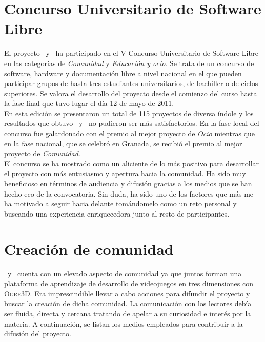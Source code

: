 \section*{Concurso Universitario de Software Libre}

El proyecto \wiki\ y \juego\ ha participado en el V Concurso Universitario
de Software Libre en las categorías de \textit{Comunidad} y \textit{Educación y ocio}.
Se trata de un concurso de software, hardware y documentación libre a nivel
nacional en el que pueden participar grupos de hasta tres estudiantes universitarios,
de bachiller o de ciclos superiores. Se valora el desarrollo del proyecto
desde el comienzo del curso hasta la fase final que tuvo lugar el día
12 de mayo de 2011.\\

En esta edición se presentaron un total de 115 proyectos de diversa índole
y los resultados que obtuvo \wiki\ y \juego\ no pudieron ser más satisfactorios.
En la fase local del concurso fue galardonado con el premio al mejor
proyecto de \textit{Ocio} mientras que en la fase nacional, que se celebró en Granada,
se recibió el premio al mejor proyecto de \textit{Comunidad}.\\

El concurso se ha mostrado como un aliciente de lo más positivo para desarrollar
el proyecto con más entusiasmo y apertura hacia la comunidad. Ha sido muy
beneficioso en términos de audiencia y difusión gracias a los medios
que se han hecho eco de la convocatoria. Sin duda, ha sido uno de los
factores que más me ha motivado a seguir hacia delante tomándomelo como un
reto personal y buscando una experiencia enriquecedora junto al resto
de participantes.\\


\section*{Creación de comunidad}

\wiki\ y \juego\ cuenta con un elevado aspecto de comunidad ya que juntos
forman una plataforma de aprendizaje de desarrollo de videojuegos en tres
dimensiones con \textsc{Ogre3D}. Era imprescindible llevar a cabo acciones
para difundir el proyecto y buscar la creación de dicha comunidad. La comunicación
con los lectores debía ser fluida, directa y cercana tratando de apelar
a su curiosidad e interés por la materia. A continuación, se listan los medios
empleados para contribuir a la difusión del proyecto.\\

